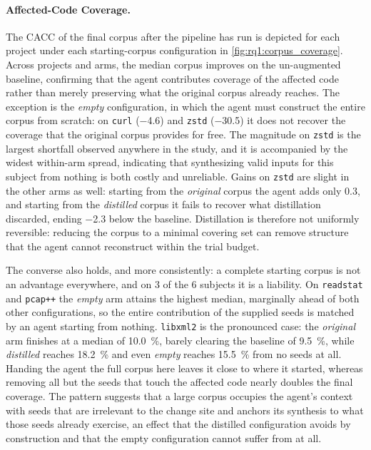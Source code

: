 \paragraph{Affected-Code Coverage.}
The \ac{CACC} of the final corpus after the pipeline has run is depicted for each project under each starting-corpus configuration in \cref{fig:rq1:corpus_coverage}.
Across projects and arms, the median corpus improves on the un-augmented baseline, confirming that the agent contributes coverage of the affected code rather than merely preserving what the original corpus already reaches.
The exception is the \emph{empty} configuration, in which the agent must construct the entire corpus from scratch: on \texttt{curl} (\SI{-4.6}{\pp}) and \texttt{zstd} (\SI{-30.5}{\pp}) it does not recover the coverage that the original corpus provides for free.
The magnitude on \texttt{zstd} is the largest shortfall observed anywhere in the study, and it is accompanied by the widest within-arm spread, indicating that synthesizing valid inputs for this subject from nothing is both costly and unreliable.
Gains on \texttt{zstd} are slight in the other arms as well: starting from the \emph{original} corpus the agent adds only \SI[explicit-sign]{+0.3}{\pp}, and starting from the \emph{distilled} corpus it fails to recover what distillation discarded, ending \SI[explicit-sign]{-2.3}{\pp} below the baseline.
Distillation is therefore not uniformly reversible: reducing the corpus to a minimal covering set can remove structure that the agent cannot reconstruct within the trial budget.

The converse also holds, and more consistently: a complete starting corpus is not an advantage everywhere, and on \num{3} of the \num{6} subjects it is a liability.
On \texttt{readstat} and \texttt{pcap++} the \emph{empty} arm attains the highest median, marginally ahead of both other configurations, so the entire contribution of the supplied seeds is matched by an agent starting from nothing.
\texttt{libxml2} is the pronounced case: the \emph{original} arm finishes at a median of \SI{10.0}{\percent}, barely clearing the baseline of \SI{9.5}{\percent}, while \emph{distilled} reaches \SI{18.2}{\percent} and even \emph{empty} reaches \SI{15.5}{\percent} from no seeds at all.
Handing the agent the full corpus here leaves it close to where it started, whereas removing all but the seeds that touch the affected code nearly doubles the final coverage.
The pattern suggests that a large corpus occupies the agent's context with seeds that are irrelevant to the change site and anchors its synthesis to what those seeds already exercise, an effect that the distilled configuration avoids by construction and that the empty configuration cannot suffer from at all.


